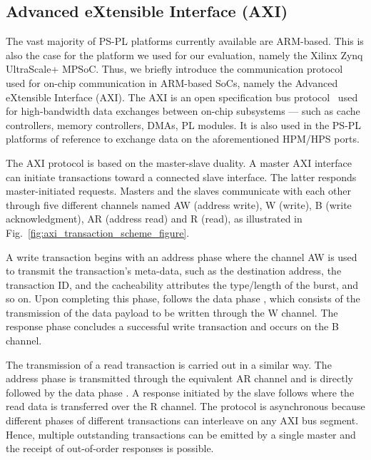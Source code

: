 \subsection{Advanced eXtensible Interface (AXI)}
\label{subsec:axi_transaction_scheme}
The vast majority of PS-PL platforms currently available are
ARM-based. This is also the case for the platform we used for our
evaluation, namely the Xilinx Zynq UltraScale+ MPSoC. Thus, we briefly
introduce the communication protocol used for on-chip communication in
ARM-based SoCs, namely the Advanced eXtensible Interface (AXI). The
AXI is an open specification bus protocol~\cite{ARM-AXI} used for
high-bandwidth data exchanges between on-chip subsystems --- such as
cache controllers, memory controllers, DMAs, PL modules. It is also
used in the PS-PL platforms of reference to exchange data on the
aforementioned HPM/HPS ports.

The AXI protocol is based on the master-slave duality. A master AXI
interface can initiate transactions toward a connected slave
interface.  The latter responds master-initiated
requests.  Masters and the slaves communicate with each other through
five different channels named AW (address write), W (write), B (write
acknowledgment), AR (address read) and R (read), as illustrated in
Fig.~\ref{fig:axi_transaction_scheme_figure}.

A write transaction begins with an address phase  where the
channel AW is used to transmit the transaction's meta-data, such
as the destination address, the transaction ID, and the cacheability
attributes the type/length of the burst, and so on.  Upon completing this phase, follows the data phase , which
consists of the transmission of the data payload to be written through
the W channel.  The response phase  concludes a successful write transaction and occurs on the B channel.

The transmission of a read transaction is carried out in a similar
way.  The address phase  is transmitted through the
equivalent AR channel and is directly followed by the data phase
.  A response initiated by the slave follows where the
read data is transferred over the R channel. The protocol is
asynchronous because different phases of different transactions can
interleave on any AXI bus segment. Hence, multiple outstanding
transactions can be emitted by a single master and the receipt of
out-of-order responses is possible.

%  

